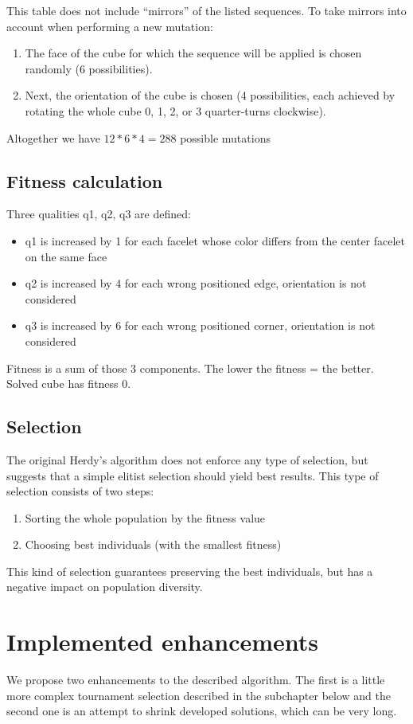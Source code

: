 \documentclass[a4paper]{article}
\begin{document}
This table does not include “mirrors” of the listed sequences.
To take mirrors into account when performing a new mutation:
\begin{enumerate}
\item The face of the cube for which the sequence will be applied is chosen randomly (6 possibilities).
\item Next, the orientation of the cube is chosen (4 possibilities, each achieved by rotating the whole cube 0, 1, 2, or 3 quarter-turns clockwise).
\end{enumerate}
Altogether we have \(12*6*4 = 288\) possible mutations

\subsection{Fitness calculation}
Three qualities q1, q2, q3 are defined:
\begin{itemize}
\item q1 is increased by 1 for each facelet whose color differs from the center facelet on the same face
\item q2 is increased by 4 for each wrong positioned edge, orientation is not considered
\item q3 is increased by 6 for each wrong positioned corner, orientation is not considered
\end{itemize}
Fitness is a sum of those 3 components. The lower the fitness = the better. Solved cube has fitness 0.

\subsection{Selection}
The original Herdy’s algorithm does not enforce any type of selection, but suggests that a simple elitist selection should yield best results. This type of selection consists of two steps:

\begin{enumerate}
\item Sorting the whole population by the fitness value
\item Choosing  best individuals (with the smallest fitness)
\end{enumerate}

This kind of selection guarantees preserving the best individuals, but has a negative impact on population diversity.

\section{Implemented enhancements}
We propose two enhancements to the described algorithm. The first is a little more complex tournament selection described in the subchapter below and the second one is an attempt to shrink developed solutions, which can be very long.
\end{document}
